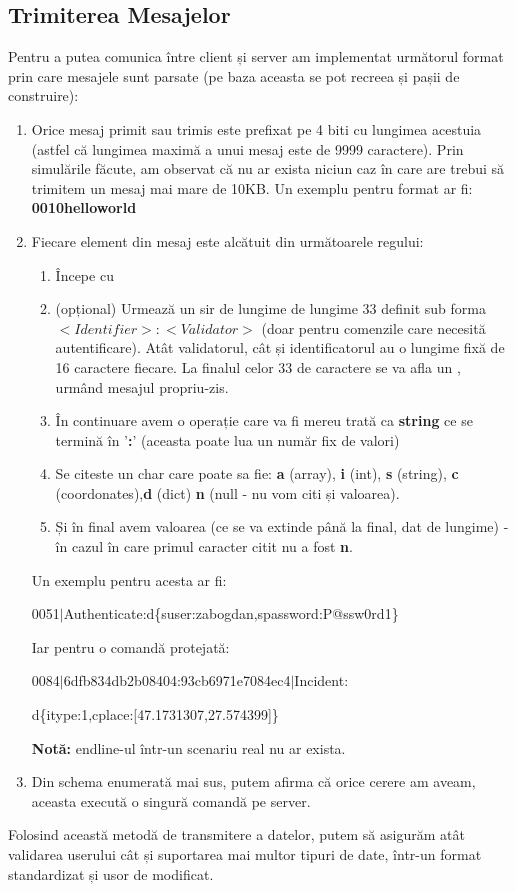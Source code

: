 \documentclass{article}
\begin{document}
\subsection{Trimiterea Mesajelor}
Pentru a putea comunica între client și server am implementat următorul format prin care mesajele sunt parsate (pe baza aceasta se pot recreea și pașii de construire):
\begin{enumerate}
    \item Orice mesaj primit sau trimis este prefixat pe 4 biti cu lungimea acestuia (astfel că lungimea maximă a unui mesaj este de 9999 caractere). Prin simulările făcute, am observat că nu ar exista niciun caz în care are trebui să trimitem un mesaj mai mare de 10KB. Un exemplu pentru format ar fi: \textbf{0010helloworld}
    \item Fiecare element din mesaj este alcătuit din următoarele regului: 
    \begin{enumerate}
        \item Începe cu \textbar 
        \item (opțional) Urmează un sir de lungime de lungime 33 definit sub forma \(<Identifier>:<Validator>\) (doar pentru comenzile care necesită autentificare). Atât validatorul, cât și identificatorul au o lungime fixă de 16 caractere fiecare. La finalul celor 33 de caractere se va afla un \textbar, urmând mesajul propriu-zis.
        \item În continuare avem o operație care va fi mereu trată ca \textbf{string} ce se termină în '\textbf{:}' (aceasta poate lua un număr fix de valori)
        \item Se citeste un char care poate sa fie: \textbf{a} (array), \textbf{i} (int), \textbf{s} (string), \textbf{c} (coordonates),\textbf{d} (dict) \textbf{n} (null - nu vom citi și valoarea).
        \item Și în final avem valoarea (ce se va extinde până la final, dat de lungime) - în cazul în care primul caracter citit nu a fost \textbf{n}.
    \end{enumerate}
    Un exemplu pentru acesta ar fi: 
    
    0051\(\vert\)Authenticate:d\{suser:zabogdan,spassword:P@ssw0rd1\}

    Iar pentru o comandă protejată:

    0084\(\vert\)6dfb834db2b08404:93cb6971e7084ec4\(\vert\)Incident:

    d\{itype:1,cplace:[47.1731307,27.574399]\}

    \textbf{Notă:} endline-ul într-un scenariu real nu ar exista.

    \item Din schema enumerată mai sus, putem afirma că orice cerere am aveam, aceasta execută o singură comandă pe server.
\end{enumerate}
Folosind această metodă de transmitere a datelor, putem să asigurăm atât validarea userului cât și suportarea mai multor tipuri de date, într-un format standardizat și usor de modificat.
\end{document}
